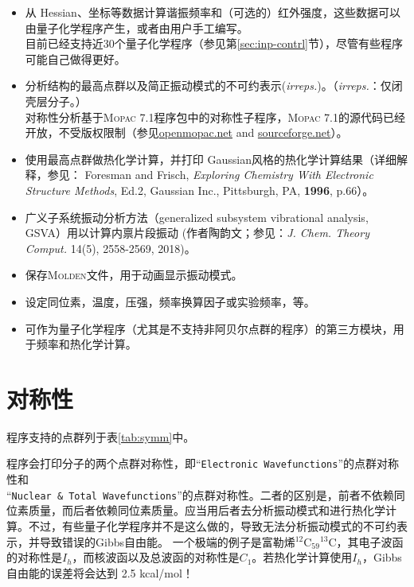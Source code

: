 \documentclass[12pt,a4paper,openany,twoside,cap,UTF8]{ctexbook}
\begin{document}
\begin{itemize}
\item 从 Hessian、坐标等数据计算谐振频率和（可选的）红外强度，这些数据可以由量子化学程序产生，或者由用户手工编写。 \\
目前已经支持近30个量子化学程序（参见第\ref{sec:inp-contrl}节），尽管有些程序可能自己做得更好。
\item 分析结构的最高点群以及简正振动模式的不可约表示(\emph{irreps.})。（\emph{irreps.}：仅闭壳层分子。） \\
对称性分析基于\textsc{Mopac} 7.1程序包中的对称性子程序，\textsc{Mopac} 7.1的源代码已经开放，不受版权限制（参见\href{http://openmopac.net/Downloads/Downloads.html}{openmopac.net} and \href{https://sourceforge.net/projects/mopac7/}{sourceforge.net}）。
\item 使用最高点群做热化学计算，并打印 Gaussian风格的热化学计算结果（详细解释，参见： Foresman and Frisch, \emph{Exploring Chemistry With Electronic Structure Methods}, Ed.2, Gaussian Inc., Pittsburgh, PA, \textbf{1996}, p.66）。
\item 广义子系统振动分析方法（generalized subsystem vibrational analysis, GSVA）用以计算内禀片段振动 (作者陶韵文；参见：\textit{J. Chem. Theory Comput.} 14(5), 2558-2569, 2018)。
\item 保存\textsc{Molden}文件，用于动画显示振动模式。
\item 设定同位素，温度，压强，频率换算因子或实验频率，等。
\item 可作为量子化学程序（尤其是不支持非阿贝尔点群的程序）的第三方模块，用于频率和热化学计算。
\end{itemize}

\section{对称性} \label{sec:symm}

程序支持的点群列于表\ref{tab:symm}中。

程序会打印分子的两个点群对称性，即``\verb|Electronic Wavefunctions|''的点群对称性和 \\
``\verb|Nuclear & Total Wavefunctions|''的点群对称性。二者的区别是，前者不依赖同位素质量，而后者依赖同位素质量。应当用后者去分析振动模式和进行热化学计算。不过，有些量子化学程序并不是这么做的，导致无法分析振动模式的不可约表示，并导致错误的Gibbs自由能。
一个极端的例子是富勒烯$^{12}$C$_{59}{}^{13}$C，其电子波函的对称性是$I_h$，而核波函以及总波函的对称性是$C_1$。若热化学计算使用$I_h$，Gibbs自由能的误差将会达到 2.5 kcal/mol！
\end{document}
